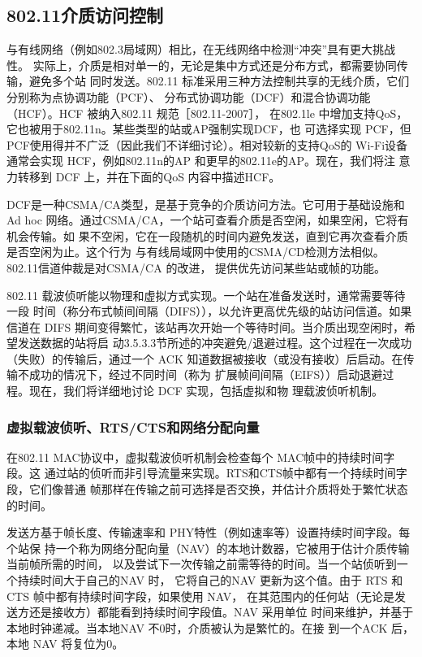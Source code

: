 \subsection{802.11介质访问控制}

与有线网络（例如802.3局域网）相比，在无线网络中检测“冲突”具有更大挑战性。
实际上，介质是相对单一的，无论是集中方式还是分布方式，都需要协同传输，避免多个站
同时发送。802.11 标准采用三种方法控制共享的无线介质，它们分别称为点协调功能（PCF）、
分布式协调功能（DCF）和混合协调功能（HCF）。HCF 被纳入802.11 规范［802.11-2007］，
在802.1le 中增加支持QoS，它也被用于802.11n。某些类型的站或AP强制实现DCF，也
可选择实现 PCF，但PCF使用得并不广泛（因此我们不详细讨论）。相对较新的支持QoS的
Wi-Fi设备通常会实现 HCF，例如802.11n的AP 和更早的802.11e的AP。现在，我们将注
意力转移到 DCF 上，并在下面的QoS 内容中描述HCF。

DCF是一种CSMA/CA类型，是基于竞争的介质访问方法。它可用于基础设施和Ad
hoc 网络。通过CSMA/CA，一个站可查看介质是否空闲，如果空闲，它将有机会传输。如
果不空闲，它在一段随机的时间内避免发送，直到它再次查看介质是否空闲为止。这个行为
与有线局域网中使用的CSMA/CD检测方法相似。802.11信道仲裁是对CSMA/CA 的改进，
提供优先访问某些站或帧的功能。

802.11 载波侦听能以物理和虚拟方式实现。一个站在准备发送时，通常需要等待一段
时间（称分布式帧间间隔（DIFS）），以允许更高优先级的站访问信道。如果信道在 DIFS
期间变得繁忙，该站再次开始一个等待时间。当介质出现空闲时，希望发送数据的站将启
动3.5.3.3节所述的冲突避免/退避过程。这个过程在一次成功（失败）的传输后，通过一个
ACK 知道数据被接收（或没有接收）后启动。在传输不成功的情况下，经过不同时间（称为
扩展帧间间隔（EIFS））启动退避过程。现在，我们将详细地讨论 DCF 实现，包括虚拟和物
理载波侦听机制。

\subsubsection{虚拟载波侦听、RTS/CTS和网络分配向量}

在802.11 MAC协议中，虚拟载波侦听机制会检查每个 MAC帧中的持续时间字段。这
通过站的侦听而非引导流量来实现。RTS和CTS帧中都有一个持续时间字段，它们像普通
帧那样在传输之前可选择是否交换，并估计介质将处于繁忙状态的时间。

发送方基于帧长度、传输速率和 PHY特性（例如速率等）设置持续时间字段。每个站保
持一个称为网络分配向量（NAV）的本地计数器，它被用于估计介质传输当前帧所需的时间，
以及尝试下一次传输之前需等待的时间。当一个站侦听到一个持续时间大于自己的NAV 时，
它将自己的NAV 更新为这个值。由于 RTS 和 CTS 帧中都有持续时间字段，如果使用 NAV，
在其范围内的任何站（无论是发送方还是接收方）都能看到持续时间字段值。NAV 采用单位
时间来维护，并基于本地时钟递减。当本地NAV 不0时，介质被认为是繁忙的。在接
到一个ACK 后，本地 NAV 将复位为0。

